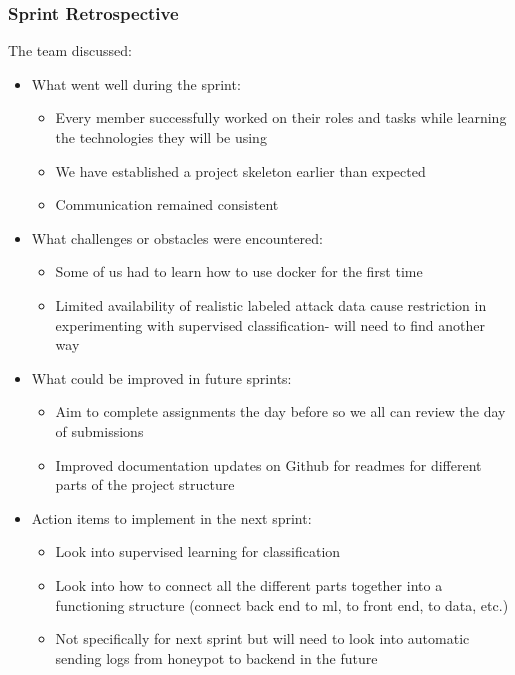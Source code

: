 \documentclass{article}
\begin{document}
\subsubsection{Sprint Retrospective}
The team discussed:

\begin{itemize}
    \item What went well during the sprint:
    \begin{itemize}
        \item Every member successfully worked on their roles and tasks while learning the technologies they will be using
        \item We have established a project skeleton earlier than expected 
        \item Communication remained consistent 
    \end{itemize}
    \item What challenges or obstacles were encountered:
    \begin{itemize}
        \item Some of us had to learn how to use docker for the first time 
        \item Limited availability of realistic labeled attack data cause restriction in experimenting with supervised classification- will need to find another way 
    \end{itemize}

    \item What could be improved in future sprints:
    \begin{itemize}
        \item Aim to complete assignments the day before so we all can review the day of submissions
        \item Improved documentation updates on Github for readmes for different parts of the project structure 
    \end{itemize}
    \item Action items to implement in the next sprint:
    \begin{itemize}
        \item Look into supervised learning for classification 
        \item Look into how to connect all the different parts together into a functioning structure (connect back end to ml, to front end, to data, etc.)
        \item Not specifically for next sprint but will need to look into automatic sending logs from honeypot to backend in the future
    \end{itemize}
\end{itemize}
\end{document}

